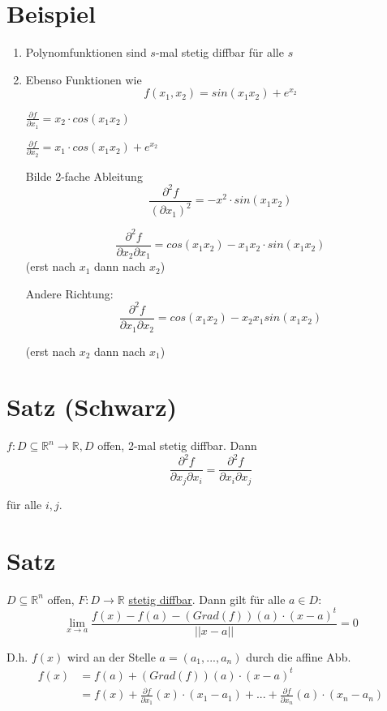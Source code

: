 \documentclass[a4paper, openany]{book}
\begin{document}
          \section{Beispiel}

          \begin{enumerate}[label=(\alph*)]
            \item Polynomfunktionen sind $s$-mal stetig diffbar für alle $s$

            \item Ebenso Funktionen wie \[ f(x_1, x_2) = sin(x_1x_2) + e^{x_2} \]

            $\frac{\partial f}{\partial x_1} = x_2 \cdot  cos(x_1x_2) $

            $\frac{\partial f}{\partial x_2} = x_1 \cdot cos(x_1x_2) + e^{x_2}$

            Bilde 2-fache Ableitung \[ \frac{\partial^2 f}{(\partial x_1)^2} = -x^2 \cdot sin(x_1x_2) \]

            \[ \frac{\partial^2 f}{\partial x_2 \partial x_1} = cos(x_1x_2) - x_1x_2 \cdot sin(x_1x_2) \] (erst nach $x_1$ dann nach $x_2$)

            Andere Richtung: \[ \frac{\partial^2 f}{\partial x_1 \partial x_2} = cos(x_1x_2) - x_2x_1 sin(x_1x_2) \]

            (erst nach $x_2$ dann nach $x_1$)
          \end{enumerate}

          \section{Satz (Schwarz)}

          $f : D \subseteq \mathbb{R}^n \rightarrow \mathbb{R}, D$ offen, 2-mal stetig diffbar. Dann \[ \frac{\partial^2 f}{\partial x_j \partial x_i} = \frac{\partial^2 f}{\partial x_i \partial x_j} \]

          für alle $i,j$.

          \section{Satz}

          $D \subseteq \mathbb{R}^n$ offen, $F: D \rightarrow \mathbb{R}$ \underline{stetig diffbar}. Dann gilt für alle $a \in D$: \[ \lim_{x \rightarrow a} \frac{f(x)-f(a)- (Grad(f))(a) \cdot (x-a)^t}{||x-a||} = 0\]

          D.h. $f(x)$ wird an der Stelle $a = (a_1, ..., a_n)$ durch die affine Abb. \begin{align*} f(x) & = f(a) + (Grad(f))(a) \cdot (x-a)^t \\ & = f(x) + \frac{\partial f}{\partial x_1}(x) \cdot (x_1-a_1) + ... + \frac{\partial f}{\partial x_n}(a) \cdot (x_n - a_n) \end{align*}
\end{document}
